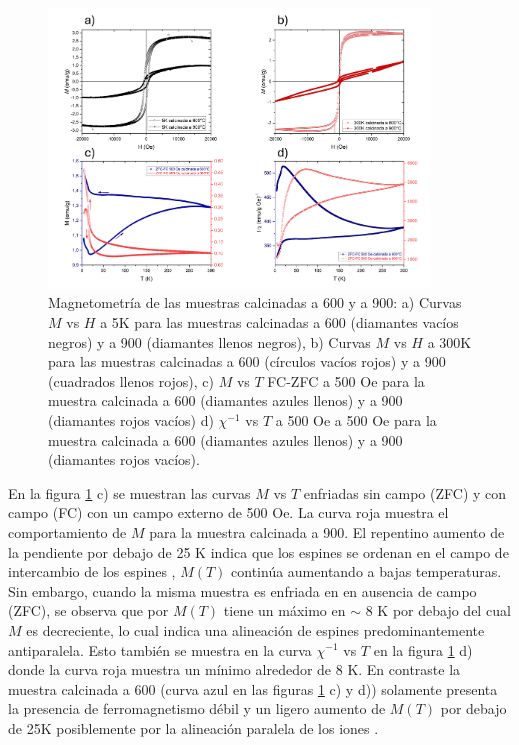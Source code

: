 \documentclass[../main.tex]{subfiles}
\begin{document}
\begin{figure}[H]
    \centering
    \includegraphics[width=0.9\textwidth]{fig/Magnetometria_NdFeO3_T_calc.png}
    \caption{Magnetometría de las muestras \neod{} calcinadas a 600\gradoC{} y a 900\gradoC{}: a) Curvas $M$ vs $H$ a 5K para las muestras calcinadas a 600\gradoC{}  (diamantes vacíos negros) y a 900\gradoC{} (diamantes llenos negros), b) Curvas $M$ vs $H$ a 300K para las muestras calcinadas a 600\gradoC{}  (círculos vacíos rojos) y a 900\gradoC{} (cuadrados llenos rojos),  c) $M$ vs $T$ FC-ZFC a 500 Oe para la muestra calcinada a 600\gradoC{} (diamantes azules llenos) y a 900\gradoC{} (diamantes rojos vacíos) d) $\chi^{-1}$ vs $T$ a 500 Oe a 500 Oe para la muestra calcinada a 600\gradoC{} (diamantes azules llenos) y a 900\gradoC{} (diamantes rojos vacíos).}
    \label{fig:mvhNd}
\end{figure}

En la figura \ref{fig:mvhNd} c) se muestran las curvas $M$ vs $T$ enfriadas sin campo (ZFC) y con campo (FC) con un campo externo de 500 Oe. La curva roja muestra el comportamiento de $M$ para la muestra calcinada a 900\gradoC{}.  El repentino aumento de la pendiente por debajo de 25 K indica que los espines  se ordenan en el campo de intercambio de los espines ,  $M(T)$ continúa aumentando a bajas temperaturas. Sin embargo, cuando la misma muestra es enfriada en en ausencia de campo (ZFC), se observa que por $M(T)$ tiene un máximo en $\sim$ 8 K por debajo del cual $M$ es decreciente, lo cual indica una alineación de espines predominantemente antiparalela. Esto también se muestra en la curva $\chi^{-1}$ vs $T$ en la figura \ref{fig:mvhNd} d) donde la curva roja muestra un mínimo alrededor de 8 K. En contraste la muestra calcinada a 600\gradoC{} (curva azul en las figuras \ref{fig:mvhNd} c) y d)) solamente presenta la presencia de ferromagnetismo débil y un ligero aumento de $M(T)$ por debajo de 25K posiblemente por la alineación paralela de los iones .
\end{document}
